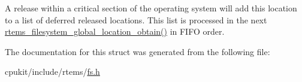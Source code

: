 A release within a critical section of the operating system will add this location to a list of deferred released locations. This list is processed in the next \mbox{\hyperlink{group__LibIOInternal_ga3df19d6d5f1f73b574478e7c4b42e643}{rtems\+\_\+filesystem\+\_\+global\+\_\+location\+\_\+obtain()}} in F\+I\+FO order. 

The documentation for this struct was generated from the following file\+:\begin{DoxyCompactItemize}
\item 
cpukit/include/rtems/\mbox{\hyperlink{include_2rtems_2fs_8h}{fs.\+h}}\end{DoxyCompactItemize}
